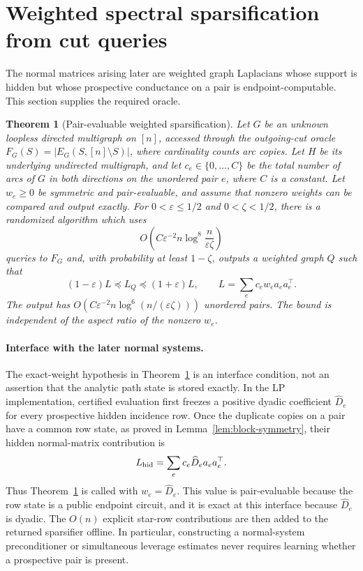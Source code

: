 \documentclass[11pt]{article}
\newtheorem{theorem}{Theorem}[section]
\theoremstyle{definition}
\newcommand{\eps}{\varepsilon}
\begin{document}
\section{Weighted spectral sparsification from cut queries}
\label{sec:spectral}

The normal matrices arising later are weighted graph Laplacians whose support
is hidden but whose prospective conductance on a pair is endpoint-computable.
This section supplies the required oracle.

\begin{theorem}[Pair-evaluable weighted sparsification]
\label{thm:spectral}
Let $G$ be an unknown loopless directed multigraph on $[n]$, accessed through
the outgoing-cut oracle $F_G(S)=|E_G(S,[n]\setminus S)|$, where cardinality
counts arc copies.  Let $H$ be its
underlying undirected multigraph, and let
$c_e\in\{0,\ldots,C\}$ be the total number of arcs of $G$ in both directions
on the unordered pair $e$, where $C$ is a constant.  Let $w_e\ge0$ be
symmetric and pair-evaluable, and assume that nonzero weights can be compared
and output exactly.  For $0<\eps\le1/2$ and $0<\zeta<1/2$, there is a
randomized algorithm which uses
\[
 O\!\left(C\eps^{-2}n\log^8\!\frac{n}{\eps\zeta}\right)
\]
queries to $F_G$ and, with probability at least $1-\zeta$, outputs a
weighted graph $Q$ such that
\[
 (1-\eps)L\preceq L_Q\preceq(1+\eps)L,
 \qquad
 L=\sum_e c_ew_ea_ea_e^\top.
\]
The output has
$O(C\eps^{-2}n\log^6(n/(\eps\zeta)))$ unordered pairs.  The bound is
independent of the aspect ratio of the nonzero $w_e$.
\end{theorem}

\paragraph{Interface with the later normal systems.}
The exact-weight hypothesis in Theorem~\ref{thm:spectral} is an interface
condition, not an assertion that the analytic path state is stored exactly.
In the LP implementation, certified evaluation first freezes a positive
dyadic coefficient $\widehat D_e$ for every prospective hidden incidence
row.  Once the duplicate copies on a pair have a common row state, as proved
in Lemma~\ref{lem:block-symmetry}, their hidden normal-matrix contribution is
\[
        L_{\rm hid}
        =\sum_e c_e\widehat D_ea_ea_e^\top .
\]
Thus Theorem~\ref{thm:spectral} is called with
$w_e=\widehat D_e$.  This value is pair-evaluable because the row state is a
public endpoint circuit, and it is exact at this interface because
$\widehat D_e$ is dyadic.  The $O(n)$ explicit star-row contributions are
then added to the returned sparsifier offline.  In particular, constructing a
normal-system preconditioner or simultaneous leverage estimates never
requires learning whether a prospective pair is present.
\end{document}
